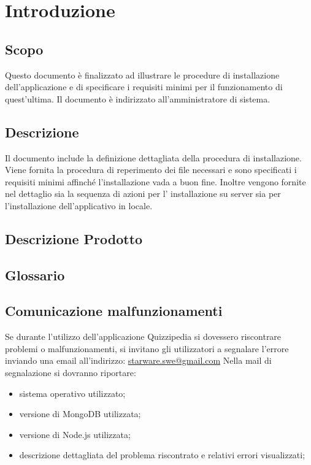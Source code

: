 \documentclass[12pt,a4paper]{article}
\begin{document}
	\newpage
	\tableofcontents
	\newpage
	\listoftables
	\listoffigures
	\newpage
	
	
	\section{Introduzione}	\label{intro}
	
	\subsection{Scopo}
	Questo documento è finalizzato ad illustrare le procedure di installazione dell'applicazione \prj{} e di specificare i requisiti minimi per il funzionamento di quest'ultima. Il documento è indirizzato all'amministratore di sistema.
	\subsection{Descrizione}
    Il documento include la definizione dettagliata della procedura di installazione. Viene fornita la procedura di reperimento dei file necessari e sono specificati i requisiti minimi affinché l'installazione vada a buon fine.
    Inoltre vengono fornite nel dettaglio sia la sequenza di azioni per l' installazione su server  sia per l'installazione dell'applicativo in locale.
   
	
	\subsection{Descrizione Prodotto}
	\descrizioneProdotto
	
	\subsection{Glossario}
	\glossarioPrint
	\subsection{Comunicazione malfunzionamenti}
		Se durante l’utilizzo dell’applicazione Quizzipedia si dovessero riscontrare problemi o
		malfunzionamenti, si invitano gli utilizzatori a segnalare l’errore inviando una email
		all’indirizzo:
		\url{starware.swe@gmail.com}
		Nella mail di segnalazione si dovranno riportare:
		\begin{itemize}
			\item sistema operativo utilizzato;
			\item versione di MongoDB utilizzata;
			\item versione di Node.js utilizzata;
			\item descrizione dettagliata del problema riscontrato e relativi errori visualizzati;
		\end{itemize}
\end{document}
